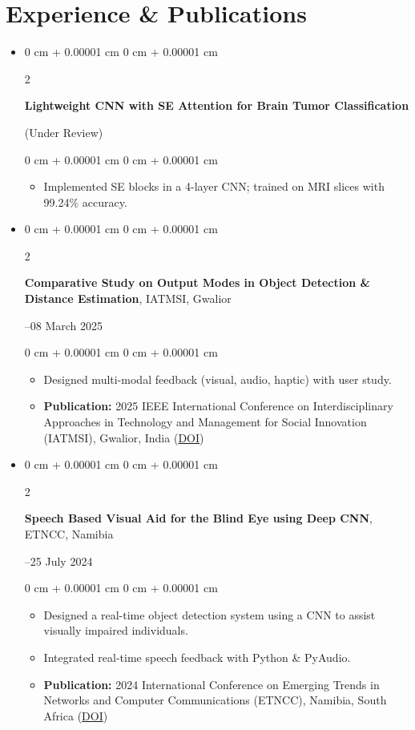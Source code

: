 \documentclass[10pt, letterpaper]{article}
\newenvironment{highlights}{
    \begin{itemize}[
        topsep=0.10 cm,
        parsep=0.10 cm,
        partopsep=0pt,
        itemsep=0pt,
        leftmargin=0 cm + 10pt
    ]
}{
    \end{itemize}
} %
\newenvironment{highlightsforbulletentries}{
    \begin{itemize}[
        topsep=0.10 cm,
        parsep=0.10 cm,
        partopsep=0pt,
        itemsep=0pt,
        leftmargin=10pt
    ]
}{
    \end{itemize}
} %
\newenvironment{onecolentry}{
    \begin{adjustwidth}{
        0 cm + 0.00001 cm
    }{
        0 cm + 0.00001 cm
    }
}{
    \end{adjustwidth}
} %
\newenvironment{twocolentry}[2][]{
    \onecolentry
    \def\secondColumn{#2}
    \setcolumnwidth{\fill, 4.5 cm}
    \begin{paracol}{2}
}{
    \switchcolumn \raggedleft \secondColumn
    \end{paracol}
    \endonecolentry
} %
\begin{document}
    \section{Experience \& Publications}
    \begin{highlightsforbulletentries}
        
        

        \item \begin{twocolentry}{2025 (Under Review)}
            \textbf{Lightweight CNN with SE Attention for Brain Tumor Classification}
        \end{twocolentry}
        \begin{onecolentry}\begin{highlights}
            \item Implemented SE blocks in a 4-layer CNN; trained on MRI slices with 99.24\% accuracy.
            
        \end{highlights}\end{onecolentry}

        \item \begin{twocolentry}{06--08 March 2025}
            \textbf{Comparative Study on Output Modes in Object Detection & Distance Estimation}, IATMSI, Gwalior
        \end{twocolentry}
        \begin{onecolentry}\begin{highlights}
            \item Designed multi-modal feedback (visual, audio, haptic) with user study.
            \item \textbf{Publication:} 2025 IEEE International Conference on Interdisciplinary Approaches in Technology and Management for Social Innovation (IATMSI), Gwalior, India (\href{https://doi.org/10.1109/IATMSI64286.2025.10984576}{DOI})
        \end{highlights}\end{onecolentry}

        \item \begin{twocolentry}{23--25 July 2024}
            \textbf{Speech Based Visual Aid for the Blind Eye using Deep CNN}, ETNCC, Namibia
        \end{twocolentry}
        \begin{onecolentry}\begin{highlights}
            \item Designed a real-time object detection system using a CNN to assist visually impaired individuals. 
            \item Integrated real-time speech feedback with Python \& PyAudio.
            \item \textbf{Publication:} 2024 International Conference on Emerging Trends in Networks and Computer Communications (ETNCC), Namibia, South Africa (\href{https://doi.org/10.1109/ETNCC63262.2024.10767556}{DOI})
        \end{highlights}\end{onecolentry}


\end{highlightsforbulletentries}
\end{document}
